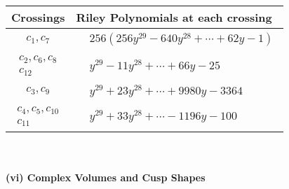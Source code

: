 \documentclass[1p]{elsarticle_modified}
\theoremstyle{definition}
\begin{document}
\begin{tabular}{m{50pt}|m{274pt}}
Crossings & \hspace{64pt}Riley Polynomials at each crossing \\
\hline $$\begin{aligned}c_{1},c_{7}\end{aligned}$$&$\begin{aligned}
&256(256 y^{29}-640 y^{28}+\cdots+62 y-1)
\end{aligned}$\\
\hline $$\begin{aligned}c_{2},c_{6},c_{8}\\c_{12}\end{aligned}$$&$\begin{aligned}
&y^{29}-11 y^{28}+\cdots+66 y-25
\end{aligned}$\\
\hline $$\begin{aligned}c_{3},c_{9}\end{aligned}$$&$\begin{aligned}
&y^{29}+23 y^{28}+\cdots+9980 y-3364
\end{aligned}$\\
\hline $$\begin{aligned}c_{4},c_{5},c_{10}\\c_{11}\end{aligned}$$&$\begin{aligned}
&y^{29}+33 y^{28}+\cdots-1196 y-100
\end{aligned}$\\
\hline
\end{tabular}\\~\\
\newpage\flushleft \textbf{(vi) Complex Volumes and Cusp Shapes}
\end{document}
